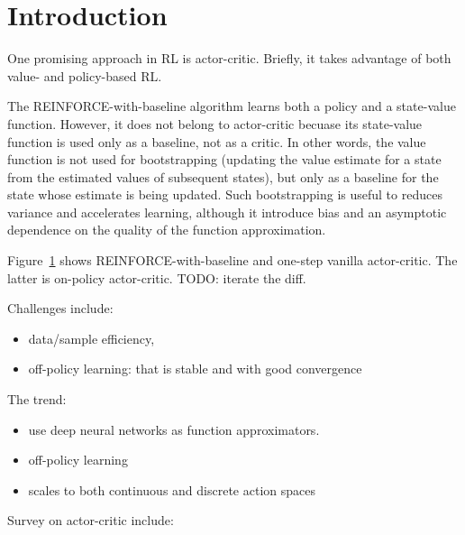\section{Introduction}

One promising approach in RL is actor-critic.
Briefly, it takes advantage of both value- and policy-based RL.

The REINFORCE-with-baseline algorithm learns both a policy and a state-value function.
However, it does not belong to actor-critic becuase
its state-value function is used only as a baseline, not as a critic.
In other words, the value function is not used for bootstrapping
(updating the value estimate for a state from the estimated values of subsequent states),
but only as a baseline for the state whose estimate is being updated.
Such bootstrapping is useful to reduces variance and accelerates learning,
although it introduce bias and an asymptotic dependence on
the quality of the function approximation.

Figure~\ref{} shows REINFORCE-with-baseline and one-step vanilla actor-critic.
The latter is on-policy actor-critic.
TODO: iterate the diff.

Challenges include:
\begin{itemize}
\item data/sample efficiency,
\item off-policy learning:
      that is stable and with good convergence
\end{itemize}

The trend:
\begin{itemize}
\item use deep neural networks as function approximators.
\item off-policy learning
\item scales to both continuous and discrete action spaces
\end{itemize}

Survey on actor-critic include:
\cite{6392457}
